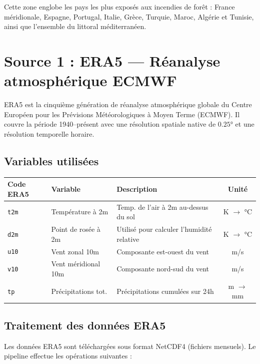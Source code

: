 \documentclass[12pt,a4paper]{report}
\begin{document}
Cette zone englobe les pays les plus exposés aux incendies de forêt : France méridionale,
Espagne, Portugal, Italie, Grèce, Turquie, Maroc, Algérie et Tunisie, ainsi que l'ensemble
du littoral méditerranéen.

\section{Source 1 : ERA5 — Réanalyse atmosphérique ECMWF}

ERA5 est la cinquième génération de réanalyse atmosphérique globale du Centre Européen pour
les Prévisions Météorologiques à Moyen Terme (ECMWF). Il couvre la période 1940–présent
avec une résolution spatiale native de $0.25°$ et une résolution temporelle horaire.

\subsection{Variables utilisées}

\begin{center}
\begin{tabularx}{\textwidth}{llXc}
\toprule
\rowcolor{fireOrange!15}
\textbf{Code ERA5} & \textbf{Variable} & \textbf{Description} & \textbf{Unité} \\
\midrule
\texttt{t2m}  & Température à 2m    & Temp. de l'air à 2m au-dessus du sol & K $\to$ °C \\
\texttt{d2m}  & Point de rosée à 2m & Utilisé pour calculer l'humidité relative & K $\to$ °C \\
\texttt{u10}  & Vent zonal 10m      & Composante est-ouest du vent & m/s \\
\texttt{v10}  & Vent méridional 10m & Composante nord-sud du vent & m/s \\
\texttt{tp}   & Précipitations tot. & Précipitations cumulées sur 24h & m $\to$ mm \\
\bottomrule
\end{tabularx}
\end{center}

\subsection{Traitement des données ERA5}

Les données ERA5 sont téléchargées sous format NetCDF4 (fichiers mensuels). Le pipeline
effectue les opérations suivantes :
\end{document}
